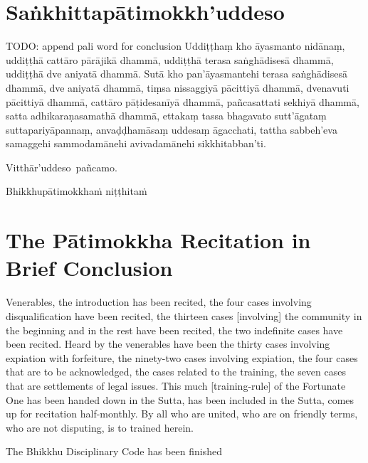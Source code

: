 \section{Saṅkhittapātimokkh'uddeso}
\label{sankhittapatimokkh'uddeso}
TODO: append pali word for conclusion
Uddiṭṭhaṃ kho āyasmanto nidānaṃ, uddiṭṭhā cattāro pārājikā dhammā, uddiṭṭhā terasa saṅghādisesā dhammā, uddiṭṭhā dve aniyatā dhammā. Sutā kho pan'āyasmantehi terasa saṅghādisesā dhammā, dve aniyatā dhammā, tiṃsa nissaggiyā pācittiyā dhammā, dvenavuti pācittiyā dhammā, cattāro pāṭidesanīyā dhammā, pañcasattati sekhiyā dhammā, satta adhikaraṇasamathā dhammā, ettakaṃ tassa bhagavato sutt'āgataṃ suttapariyāpannaṃ, anvaḍḍhamāsaṃ uddesaṃ āgacchati, tattha sabbeh'eva samaggehi sammodamānehi avivadamānehi sikkhitabban'ti.

Vitthār'uddeso pañcamo.

\begin{outro}
Bhikkhupātimokkhaṁ niṭṭhitaṁ
\end{outro}

\clearpage

\section{The Pātimokkha Recitation in Brief Conclusion}
\label{patimokkha-in-brief-conclusion}

Venerables, the introduction has been recited, the four cases involving disqualification have been recited, the thirteen cases [involving] the community in the beginning and in the rest have been recited, the two indefinite cases have been recited. Heard by the venerables have been the thirty cases involving expiation with forfeiture, the ninety-two cases involving expiation, the four cases that are to be acknowledged, the cases related to the training, the seven cases that are settlements of legal issues. This much [training-rule] of the Fortunate One has been handed down in the Sutta, has been included in the Sutta, comes up for recitation half-monthly. By all who are united, who are on friendly terms, who are not disputing, is to trained herein.

\begin{outro}
  The Bhikkhu Disciplinary Code has been finished
\end{outro}

\clearpage
